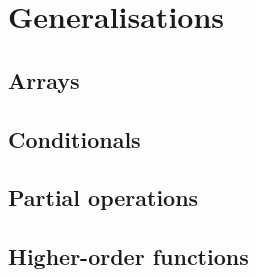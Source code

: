 \section{Generalisations}

\subsection{Arrays}

\subsection{Conditionals} 

\subsection{Partial operations} 

\subsection{Higher-order functions}
